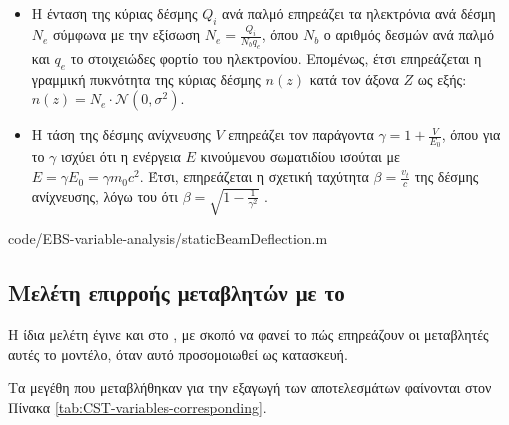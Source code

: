 \begin{itemize}
	\item Η ένταση της κύριας δέσμης $Q_i$ ανά παλμό επηρεάζει τα ηλεκτρόνια ανά δέσμη $N_e$ σύμφωνα με την εξίσωση $N_e = \frac{Q_i}{N_b q_e}$, όπου $N_b$ ο αριθμός δεσμών ανά παλμό και $q_e$ το στοιχειώδες φορτίο του ηλεκτρονίου.
	Επομένως, έτσι επηρεάζεται η γραμμική πυκνότητα της κύριας δέσμης $n(z)$ κατά τον άξονα $Z$ ως εξής: $n(z) = N_e \cdot \mathcal{N}\left(0, \sigma^2 \right)$.
	\item Η τάση της δέσμης ανίχνευσης $V$ επηρεάζει τον παράγοντα  $\gamma = 1 + \frac{V}{E_0}$, όπου για το $\gamma$ ισχύει ότι η ενέργεια $E$ κινούμενου σωματιδίου ισούται με $E = \gamma E_0 = \gamma m_ 0c^2$. 
	Έτσι, επηρεάζεται η σχετική ταχύτητα $\beta =\frac{v_t}{c}$ της δέσμης ανίχνευσης, λόγω του ότι $\beta = \sqrt{1 - \frac{1}{\gamma^2}}$ \cite{Forshaw2014}.
\end{itemize}


{code/EBS-variable-analysis/staticBeamDeflection.m}

\subsection{Μελέτη επιρροής μεταβλητών με το } \label{sub:variable-analysis-CST}
Η ίδια μελέτη έγινε και στο , με σκοπό να φανεί το πώς επηρεάζουν οι μεταβλητές αυτές το μοντέλο, όταν αυτό προσομοιωθεί ως κατασκευή.

Τα μεγέθη που μεταβλήθηκαν για την εξαγωγή των αποτελεσμάτων φαίνονται στον Πίνακα \ref{tab:CST-variables-corresponding}. 


